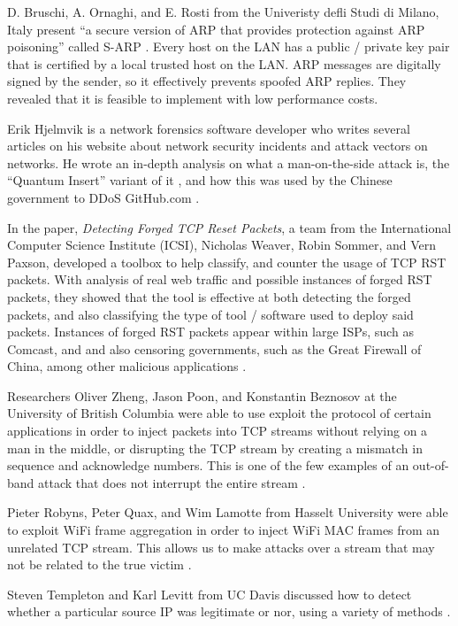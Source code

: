 \documentclass[journal]{IEEEtran}
\begin{document}
D. Bruschi, A. Ornaghi, and E. Rosti from the Univeristy defli Studi di Milano, Italy present ``a secure version of ARP that provides protection against ARP poisoning'' called S-ARP \cite{SARP}. Every host on the LAN has a public / private key pair that is certified by a local trusted host on the LAN. ARP messages are digitally signed by the sender, so it effectively prevents spoofed ARP replies. They revealed that it is feasible to implement with low  performance costs.

Erik Hjelmvik is a network forensics software developer who writes several articles on his website about network security incidents and attack vectors on networks. He wrote an in-depth analysis on what a man-on-the-side attack is, the “Quantum Insert” variant of it \cite{MOTS}, and how this was used by the Chinese government to DDoS GitHub.com \cite{china}.

In the paper, \emph{Detecting Forged TCP Reset Packets}, a team from the International Computer Science Institute (ICSI), Nicholas Weaver, Robin Sommer, and Vern Paxson, developed a toolbox to help classify, and counter the usage of TCP RST packets. With analysis of real web traffic and possible instances of forged  RST packets, they showed that the tool is effective at both detecting the forged packets, and also classifying the type of tool / software used to deploy said packets. Instances of forged RST packets appear within large ISPs, such as Comcast, and and also censoring governments, such as the Great Firewall of China, among other malicious applications \cite{rstdetection}.

Researchers Oliver Zheng, Jason Poon, and Konstantin Beznosov at the University of British Columbia were able to use exploit the protocol of certain applications in order to inject packets into TCP streams without relying on a man in the middle, or disrupting the TCP stream by creating a mismatch in sequence and acknowledge numbers. This is one of the few examples of an out-of-band attack that does not interrupt the entire stream \cite{tcphij}.

Pieter Robyns, Peter Quax, and Wim Lamotte from Hasselt University were able to exploit WiFi frame aggregation in order to inject WiFi MAC frames from an unrelated TCP stream. This allows us to make attacks over a stream that may not be related to the true victim \cite{frame}. 

Steven Templeton and Karl Levitt from UC Davis discussed how to detect whether a particular source IP was legitimate or nor, using a variety of methods \cite{detectingspoofs}.
\end{document}
